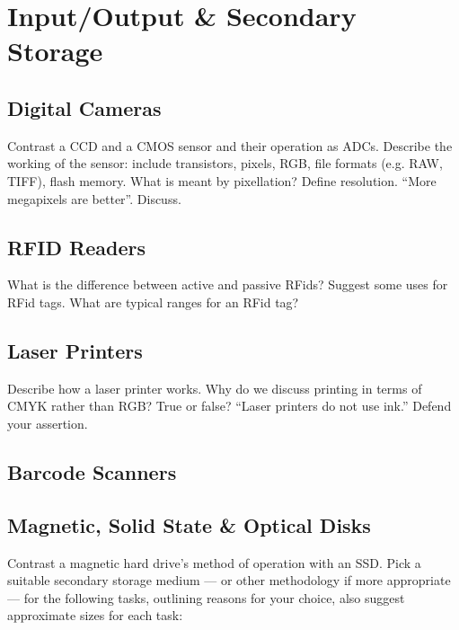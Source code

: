 \section{Input/Output \& Secondary Storage}
\begin{questions}
	\subsection{Digital Cameras}
	\question Contrast a CCD and a CMOS sensor and their operation as ADCs. 
	\question Describe the working of the sensor: include transistors, pixels, RGB, file formats (e.g. RAW, TIFF), flash memory. 
	\question What is meant by pixellation? 
	\question Define resolution. 
	\question ``More megapixels are better''. Discuss.  
	\subsection{RFID Readers}
	\question What is the difference between active and passive RFids?
	\question Suggest some uses for RFid tags. What are typical ranges for an RFid tag?  
	\subsection{Laser Printers}
	\question Describe how a laser printer works. 
	\question Why do we discuss printing in terms of CMYK rather than RGB?
	\question True or false? ``Laser printers do not use ink.'' Defend your assertion. 
	\subsection{Barcode Scanners}
	\subsection{Magnetic, Solid State \& Optical Disks}
	\question Contrast a magnetic hard drive's method of operation with an SSD. 
	\question Pick a suitable secondary storage medium --- or other methodology if more appropriate --- for the following tasks, outlining reasons for your choice, also suggest approximate sizes for each task: 
\end{questions}
